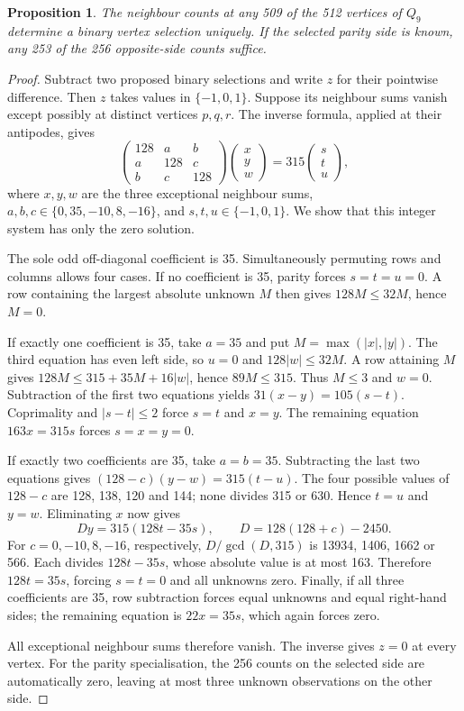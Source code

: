 \documentclass[11pt,a4paper]{article}
\newtheorem{proposition}[theorem]{Proposition}
\theoremstyle{definition}
\theoremstyle{remark}
\begin{document}
\begin{proposition}
The neighbour counts at any 509 of the 512 vertices of $Q_9$ determine
a binary vertex selection uniquely. If the selected parity side is
known, any 253 of the 256 opposite-side counts suffice.
\end{proposition}
\begin{proof}
Subtract two proposed binary selections and write $z$ for their
pointwise difference. Then $z$ takes values in $\{-1,0,1\}$. Suppose its
neighbour sums vanish except possibly at distinct vertices $p,q,r$.
The inverse formula, applied at their antipodes, gives
\[
\begin{pmatrix}128&a&b\\a&128&c\\b&c&128\end{pmatrix}
\begin{pmatrix}x\\y\\w\end{pmatrix}
=315\begin{pmatrix}s\\t\\u\end{pmatrix},
\]
where $x,y,w$ are the three exceptional neighbour sums,
$a,b,c\in\{0,35,-10,8,-16\}$, and $s,t,u\in\{-1,0,1\}$.
We show that this integer system has only the zero solution.

The sole odd off-diagonal coefficient is 35. Simultaneously permuting
rows and columns allows four cases. If no coefficient is 35, parity
forces $s=t=u=0$. A row containing the largest absolute unknown $M$
then gives $128M\le32M$, hence $M=0$.

If exactly one coefficient is 35, take $a=35$ and put
$M=\max(|x|,|y|)$. The third equation has even left side, so $u=0$ and
$128|w|\le32M$. A row attaining $M$ gives
$128M\le315+35M+16|w|$, hence $89M\le315$.
Thus $M\le3$ and $w=0$. Subtraction of the first two equations yields
$31(x-y)=105(s-t)$. Coprimality and $|s-t|\le2$ force $s=t$ and $x=y$.
The remaining equation $163x=315s$ forces $s=x=y=0$.

If exactly two coefficients are 35, take $a=b=35$.
Subtracting the last two equations gives
$(128-c)(y-w)=315(t-u)$. The four possible values of $128-c$ are
128, 138, 120 and 144; none divides 315 or 630. Hence $t=u$ and $y=w$.
Eliminating $x$ now gives
\[
D y=315(128t-35s),\qquad D=128(128+c)-2450.
\]
For $c=0,-10,8,-16$, respectively, $D/\gcd(D,315)$ is
13934, 1406, 1662 or 566. Each divides $128t-35s$, whose absolute
value is at most 163. Therefore $128t=35s$, forcing $s=t=0$ and all
unknowns zero. Finally, if all three coefficients are 35, row
subtraction forces equal unknowns and equal right-hand sides; the
remaining equation is $22x=35s$, which again forces zero.

All exceptional neighbour sums therefore vanish. The inverse gives
$z=0$ at every vertex. For the parity specialisation, the 256 counts
on the selected side are automatically zero, leaving at most three
unknown observations on the other side.
\end{proof}
\end{document}

